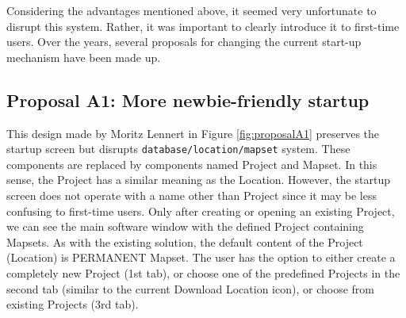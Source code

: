 \documentclass[a4paper,10pt,twoside]{article}
\begin{document}
Considering the advantages mentioned above, it seemed very unfortunate to disrupt this system. Rather, it was important to clearly introduce it to first-time users. Over the years, several proposals for changing the current start-up mechanism have been made up.

\subsection{Proposal A1: More newbie-friendly startup}

This design made by Moritz Lennert in Figure \ref{fig:proposalA1} preserves the startup screen but disrupts \texttt{database/location/mapset} system. These components are replaced by components named Project and Mapset. In this sense, the Project has a similar meaning as the Location. However, the startup screen does not operate with a name other than Project since it may be less confusing to first-time users. Only after creating or opening an existing Project, we can see the main software window with the defined Project containing Mapsets. As with the existing solution, the default content of the Project (Location) is PERMANENT Mapset. The user has the option to either create a completely new Project (1st tab), or choose one of the predefined Projects in the second tab (similar to the current Download Location icon), or choose from existing Projects (3rd tab).
\end{document}
